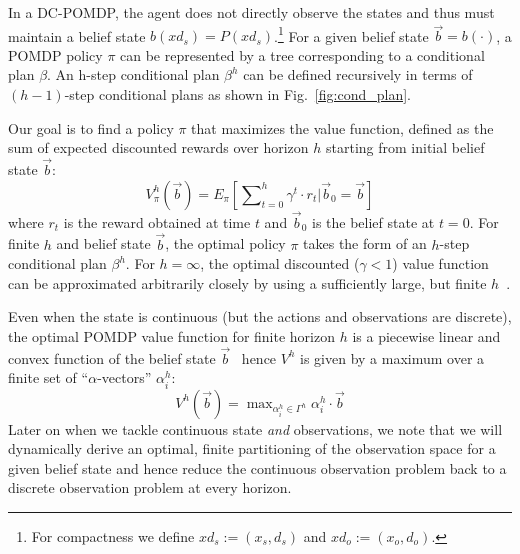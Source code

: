 \documentclass{article} %
\begin{document}
In a DC-POMDP, the agent does not directly observe the states and thus
must maintain a belief state $b(xd_s) = P(xd_s)$.\footnote{For
compactness we define $xd_s := (x_s,d_s)$ and $xd_o:=(x_o,d_o)$.}  For a
given belief state $\vec{b} = b(\cdot)$, a POMDP policy $\pi$ can be
represented by a tree corresponding to a conditional plan $\beta$.  An
h-step conditional plan $\beta^h$ can be defined recursively in terms
of $(h-1)$-step conditional plans as shown in
Fig.~\ref{fig:cond_plan}.

Our goal is to find a policy $\pi$ that maximizes the value function,
defined as the sum of expected discounted rewards over horizon $h$
starting from initial belief state $\vec{b}$:
\begin{equation}
V^h_\pi(\vec{b}) = E_{\pi} \left[ \sum\nolimits_{t=0}^{h} \gamma^t \cdot r_t \Big| \vec{b}_0 = \vec{b} \right]
\end{equation}
where $r_t$ is the reward obtained at time $t$ and $\vec{b}_0$ is the
belief state at $t=0$.  For finite $h$ and belief state $\vec{b}$, the
optimal policy $\pi$ takes the form of an $h$-step conditional plan
$\beta^h$.  For $h = \infty$, the optimal discounted ($\gamma < 1$)
value function can be approximated arbitrarily closely by using
a sufficiently large, but finite $h$~\cite{kaebling}.  

Even when the state is continuous (but the actions and observations
are discrete), 
the optimal POMDP value function for finite horizon $h$ is a piecewise linear
and convex function of the belief state $\vec{b}$~\cite{Perseus_cont} hence 
$V^h$ is given by a maximum over a finite set of
``$\alpha$-vectors'' $\alpha^h_i$:
\begin{equation}
V^h(\vec{b}) = \max\nolimits_{\alpha^h_i \in \Gamma^h} \alpha^h_i \cdot \vec{b}
\end{equation}
Later on when we tackle continuous state \emph{and} observations,
we note that we will dynamically derive an optimal, 
finite partitioning of the observation
space for a given belief state and hence reduce the continuous
observation problem back to a discrete observation problem at every
horizon.  
\end{document}
